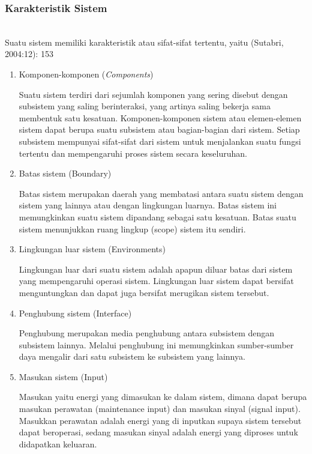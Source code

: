 \subsubsection{Karakteristik Sistem}
\hfill\\
Suatu sistem memiliki karakteristik atau sifat-sifat tertentu, yaitu (Sutabri, 2004:12): 153
\begin{enumerate}
	\item Komponen-komponen (\textit{Components})
	
Suatu sistem terdiri dari sejumlah komponen yang sering disebut dengan subsistem yang saling berinteraksi, yang artinya saling bekerja sama membentuk satu kesatuan. Komponen-komponen sistem atau elemen-elemen sistem dapat berupa suatu subsistem atau bagian-bagian dari sistem. Setiap subsistem mempunyai sifat-sifat dari sistem untuk menjalankan suatu fungsi tertentu dan mempengaruhi proses sistem secara keseluruhan.

	\item Batas sistem (Boundary) 

Batas sistem merupakan daerah yang membatasi antara suatu sistem dengan sistem yang lainnya atau dengan lingkungan luarnya. Batas sistem ini memungkinkan suatu sistem dipandang sebagai satu kesatuan. Batas suatu sistem menunjukkan ruang lingkup (scope) sistem itu sendiri. 

	\item Lingkungan luar sistem (Environments)
	
Lingkungan luar dari suatu sistem adalah apapun diluar batas dari sistem yang mempengaruhi operasi sistem. Lingkungan luar sistem dapat bersifat menguntungkan dan dapat juga bersifat merugikan sistem tersebut. 

	\item Penghubung sistem (Interface)
	 
Penghubung merupakan media penghubung antara subsistem dengan subsistem lainnya. Melalui penghubung ini memungkinkan sumber-sumber daya mengalir dari satu subsistem ke subsistem yang lainnya.
	
	\item Masukan sistem (Input)
	 
Masukan yaitu energi yang dimasukan ke dalam sistem, dimana dapat berupa masukan perawatan (maintenance input) dan masukan sinyal (signal input). Masukkan perawatan adalah energi yang di inputkan supaya sistem tersebut dapat beroperasi, sedang masukan sinyal adalah energi yang diproses untuk didapatkan keluaran.


\end{enumerate}
